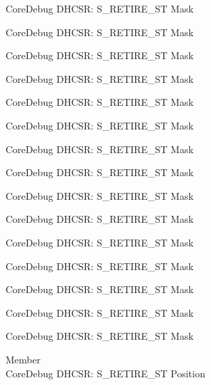 \begin{DoxyRefList}
\label{deprecated__deprecated000112}%
%
Core\+Debug DHCSR\+: S\+\_\+\+RETIRE\+\_\+\+ST Mask 

\label{deprecated__deprecated000166}%
%
Core\+Debug DHCSR\+: S\+\_\+\+RETIRE\+\_\+\+ST Mask 

\label{deprecated__deprecated000251}%
%
Core\+Debug DHCSR\+: S\+\_\+\+RETIRE\+\_\+\+ST Mask 

\label{deprecated__deprecated000308}%
%
Core\+Debug DHCSR\+: S\+\_\+\+RETIRE\+\_\+\+ST Mask 

\label{deprecated__deprecated000384}%
%
Core\+Debug DHCSR\+: S\+\_\+\+RETIRE\+\_\+\+ST Mask 

\label{deprecated__deprecated000463}%
%
Core\+Debug DHCSR\+: S\+\_\+\+RETIRE\+\_\+\+ST Mask 

\label{deprecated__deprecated000565}%
%
Core\+Debug DHCSR\+: S\+\_\+\+RETIRE\+\_\+\+ST Mask 

\label{deprecated__deprecated000671}%
%
Core\+Debug DHCSR\+: S\+\_\+\+RETIRE\+\_\+\+ST Mask 

\label{deprecated__deprecated000771}%
%
Core\+Debug DHCSR\+: S\+\_\+\+RETIRE\+\_\+\+ST Mask 

\label{deprecated__deprecated000825}%
%
Core\+Debug DHCSR\+: S\+\_\+\+RETIRE\+\_\+\+ST Mask 

\label{deprecated__deprecated000910}%
%
Core\+Debug DHCSR\+: S\+\_\+\+RETIRE\+\_\+\+ST Mask 

\label{deprecated__deprecated000967}%
%
Core\+Debug DHCSR\+: S\+\_\+\+RETIRE\+\_\+\+ST Mask 

\label{deprecated__deprecated001043}%
%
Core\+Debug DHCSR\+: S\+\_\+\+RETIRE\+\_\+\+ST Mask 

\label{deprecated__deprecated001122}%
%
Core\+Debug DHCSR\+: S\+\_\+\+RETIRE\+\_\+\+ST Mask 

\label{deprecated__deprecated001224}%
%
Core\+Debug DHCSR\+: S\+\_\+\+RETIRE\+\_\+\+ST Mask  
\item[Member \doxylink{group___c_m_s_i_s___core_debug_ga2328118f8b3574c871a53605eb17e730}{Core\+Debug\+\_\+\+DHCSR\+\_\+\+S\+\_\+\+RETIRE\+\_\+\+ST\+\_\+\+Pos} ]\hfill \\
\label{deprecated__deprecated000011}%
%
Core\+Debug DHCSR\+: S\+\_\+\+RETIRE\+\_\+\+ST Position 


\end{DoxyRefList}
